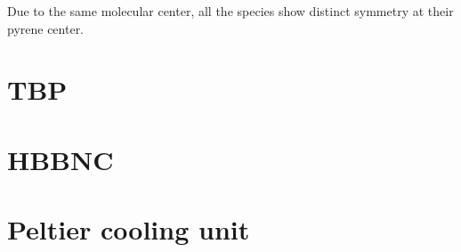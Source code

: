 \documentclass[
10pt,					%
a4paper,				%
twoside,				%
BCOR=8mm,				%
headings=normal,		%
headsepline,			%
footsepline,			%
plainfootsepline,		%
]{scrbook}
\begin{document}
Due to the same molecular center, all the species show distinct symmetry at their pyrene center. 
%
%
  
  
  
  
\restoregeometry
 \section{TBP}
 
% 
\section{HBBNC}
 
\section{Peltier cooling unit}
 
\end{document}
